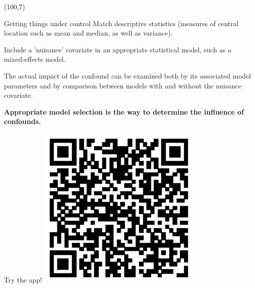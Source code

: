 \documentclass[final]{beamer}
\begin{document}
\begin{frame}{}
\begin{textblock}{48}
\end{textblock}

\begin{textblock}{18}(100,7)

\begin{block}{Getting things under control}
Match descriptive statistics (measures of central location such as mean and median, as well as variance).

\vspace{0.8cm}

Include a 'nuisance' covariate in an appropriate statistical model, such as a mixed-effects model.

\vspace{0.8cm}

The actual impact of the confound can be examined both by its associated model parameters and by comparison between models with and without the nuisance covariate.

\vspace{0.8cm}

\textbf{Appropriate model selection is the way to determine the influence of confounds.}

\end{block}

%
%

\begin{block}{Try the app!}
\centering
\includegraphics[width=0.6\textwidth]{shinyapps-url.eps}
%
\end{block}


\end{textblock}
\end{frame}
\end{document}
